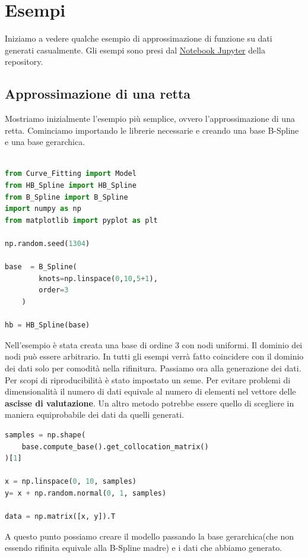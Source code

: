 \documentclass[../main.tex]{subfiles}
\begin{document}
\section{Esempi}
Iniziamo a vedere qualche esempio di approssimazione di funzione su dati generati casualmente.
Gli esempi sono presi dal \href{https://github.com/cMancio00/B-Spline/blob/main/esempi.ipynb}{Notebook Jupyter} della repository.
\subsection{Approssimazione di una retta}
Mostriamo inizialmente l'esempio più semplice, ovvero l'approssimazione di una retta. Cominciamo importando 
le librerie necessarie e creando una base B-Spline e una base gerarchica.

\begin{lstlisting}[language=Python, caption={Dichiarazione della base}]

from Curve_Fitting import Model
from HB_Spline import HB_Spline
from B_Spline import B_Spline
import numpy as np
from matplotlib import pyplot as plt

np.random.seed(1304)

base  = B_Spline(
        knots=np.linspace(0,10,5+1),
        order=3
    )

hb = HB_Spline(base)

\end{lstlisting}

Nell'esempio è stata creata una base di ordine 3 con nodi uniformi. Il dominio dei nodi può essere arbitrario. In tutti gli esempi verrà 
fatto coincidere con il dominio dei dati solo per comodità nella rifinitura.
Passiamo ora alla generazione dei dati. Per scopi di riproducibilità è stato impostato un seme. Per evitare problemi di dimensionalità 
il numero di dati equivale al numero di elementi nel vettore delle \textbf{ascisse di valutazione}. Un altro metodo potrebbe essere 
quello di scegliere in maniera equiprobabile dei dati da quelli generati. 

\begin{lstlisting}[language=Python, caption={Creazione e fit del modello}]
samples = np.shape(
    base.compute_base().get_collocation_matrix()
)[1]

x = np.linspace(0, 10, samples)
y= x + np.random.normal(0, 1, samples)

data = np.matrix([x, y]).T
\end{lstlisting} 

A questo punto possiamo creare il modello passando la base gerarchica(che non essendo rifinita equivale alla B-Spline madre) e i dati
che abbiamo generato.
\end{document}
